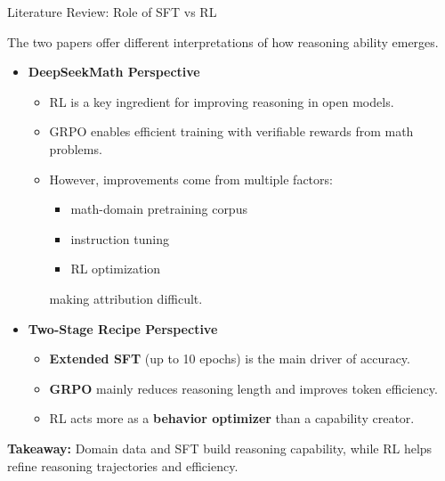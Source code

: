 \documentclass[aspectratio=169,10pt]{beamer}
\begin{document}
\begin{frame}{Literature Review: Role of SFT vs RL}

The two papers offer different interpretations of how reasoning ability emerges.

\begin{itemize}

\item \textbf{DeepSeekMath Perspective}
\begin{itemize}
    \item RL is a key ingredient for improving reasoning in open models.
    \item GRPO enables efficient training with verifiable rewards from math problems.
    \item However, improvements come from multiple factors:
    \begin{itemize}
        \item math-domain pretraining corpus
        \item instruction tuning
        \item RL optimization
    \end{itemize}
    making attribution difficult.
\end{itemize}

\item \textbf{Two-Stage Recipe Perspective}
\begin{itemize}
    \item \textbf{Extended SFT} (up to 10 epochs) is the main driver of accuracy.
    \item \textbf{GRPO} mainly reduces reasoning length and improves token efficiency.
    \item RL acts more as a \textbf{behavior optimizer} than a capability creator.
\end{itemize}

\end{itemize}

\textbf{Takeaway:} Domain data and SFT build reasoning capability, while RL helps refine reasoning trajectories and efficiency.
\end{frame}
\end{document}
